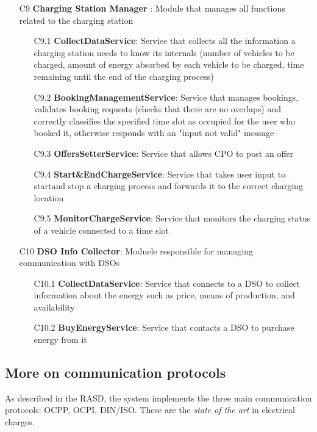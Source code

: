 \documentclass[12pt]{report}
\begin{document}
\begin{itemize}
\begin{itemize}
    \end{itemize} 
\item [C9]\textbf{Charging Station Manager }: Module that manages all functions related to the charging station 
    \begin{itemize} 
        \item [C9.1]\textbf{CollectDataService}: Service that collects all the information a charging station needs to know its internals (number of vehicles to be charged, amount of energy absorbed by each vehicle to be charged, time remaining until the end of the charging process)
        \item [C9.2]\textbf{BookingManagementService}: Service that manages bookings, validates booking requests (checks that there are no overlaps) and correctly classifies the specified time slot as occupied for the user who booked it, otherwise responds with an "input not valid" message 
        \item [C9.3]\textbf{OffersSetterService}: Service that allows CPO to post an offer 
        \item [C9.4]\textbf{Start\&EndChargeService}: Service that takes user input to startand stop a charging process and forwards it to the correct charging location 
        \item [C9.5]\textbf{MonitorChargeService}: Service that monitors the charging status of a vehicle connected to a time slot 
    \end{itemize} 
\item [C10] \textbf{DSO Info Collector}: Moduele responsible for managing communication with DSOs \begin{itemize} 
    \item [C10.1]\textbf{CollectDataService}: Service that connects to a DSO to collect information about the energy such as price, means of production, and availability 
    \item [C10.2]\textbf{BuyEnergyService}: Service that contacts a DSO to purchase energy from it 
    \end{itemize}
\end{itemize}

\subsection{More on communication protocols}
As described in the RASD, the system implements the three main communication protocols: OCPP, OCPI, DIN/ISO. These are the \emph{state of the art} in electrical charges.\newline
\end{document}
